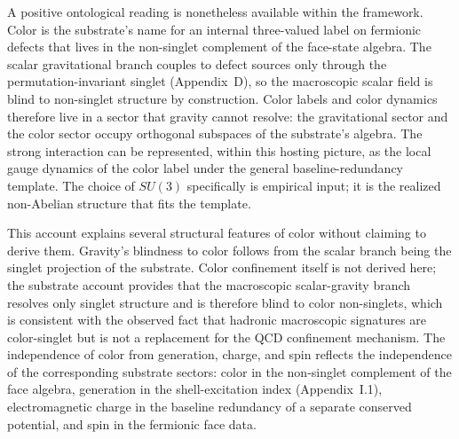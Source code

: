 \documentclass[11pt]{article}
\begin{document}
A positive ontological reading is nonetheless available within the framework. Color is the substrate's name for an internal three-valued label on fermionic defects that lives in the non-singlet complement of the face-state algebra. The scalar gravitational branch couples to defect sources only through the permutation-invariant singlet (Appendix~D), so the macroscopic scalar field is blind to non-singlet structure by construction. Color labels and color dynamics therefore live in a sector that gravity cannot resolve: the gravitational sector and the color sector occupy orthogonal subspaces of the substrate's algebra. The strong interaction can be represented, within this hosting picture, as the local gauge dynamics of the color label under the general baseline-redundancy template. The choice of $SU(3)$ specifically is empirical input; it is the realized non-Abelian structure that fits the template.

This account explains several structural features of color without claiming to derive them. Gravity's blindness to color follows from the scalar branch being the singlet projection of the substrate. Color confinement itself is not derived here; the substrate account provides that the macroscopic scalar-gravity branch resolves only singlet structure and is therefore blind to color non-singlets, which is consistent with the observed fact that hadronic macroscopic signatures are color-singlet but is not a replacement for the QCD confinement mechanism. The independence of color from generation, charge, and spin reflects the independence of the corresponding substrate sectors: color in the non-singlet complement of the face algebra, generation in the shell-excitation index (Appendix~I.1), electromagnetic charge in the baseline redundancy of a separate conserved potential, and spin in the fermionic face data.
\end{document}
